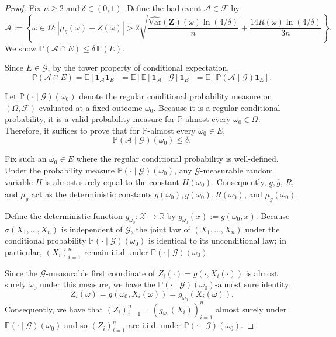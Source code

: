 \documentclass[twoside]{article}
\begin{document}
\begin{proof}
Fix $n\ge 2$ and $\delta\in(0,1)$. Define the bad event $\mathcal A \in \mathcal{F}$ by
\[
\mathcal A
:=
\left\{
\omega \in \Omega :
\left|\mu_g(\omega)-\overline{Z}(\omega)\right|
>
2\sqrt{\frac{\widehat{\mathrm{Var}}(\mathbf Z)(\omega)\ln(4/\delta)}{n}}
+\frac{14R(\omega)\ln(4/\delta)}{3n}
\right\}.
\]
We show $\mathbb{P}(\mathcal A\cap E)\le \delta\,\mathbb{P}(E)$.

Since $E\in\mathcal{G}$, by the tower property of conditional expectation,
\[
\mathbb{P}(\mathcal A\cap E)
=
\mathbb E[\mathbf 1_{\mathcal A}\mathbf 1_E]
=
\mathbb E\left[\mathbb E[\mathbf 1_{\mathcal A}\mid\mathcal{G}]\mathbf 1_E\right]
=
\mathbb E\left[\mathbb{P}(\mathcal A\mid\mathcal{G})\mathbf 1_E\right].
\]

Let $\mathbb{P}(\cdot \mid \mathcal{G})(\omega_0)$ denote the regular conditional probability measure on $(\Omega, \mathcal{F})$ evaluated at a fixed outcome $\omega_0$. Because it is a regular conditional probability, it is a valid probability measure for $\mathbb{P}$-almost every $\omega_0 \in \Omega$. Therefore, it suffices to prove that for $\mathbb{P}$-almost every $\omega_0 \in E$,
\[
\mathbb{P}(\mathcal A\mid\mathcal{G})(\omega_0)\le \delta.
\]

Fix such an $\omega_0\in E$ where the regular conditional probability is well-defined. Under the probability measure $\mathbb{P}(\cdot\mid\mathcal{G})(\omega_0)$, any $\mathcal{G}$-measurable random variable $H$ is almost surely equal to the constant $H(\omega_0)$. Consequently, $\underline{g}, \overline{g}$, $R$, and $\mu_g$ act as the deterministic constants $\underline{g}(\omega_0), \overline{g}(\omega_0), R(\omega_0)$, and $\mu_g(\omega_0)$.

Define the deterministic function $g_{\omega_0}:\mathcal{X}\to\mathbb{R}$ by $g_{\omega_0}(x):=g(\omega_0,x)$. 
Because $\sigma(X_1,\dots,X_n)$ is independent of $\mathcal{G}$, the joint law of $(X_1,\dots,X_n)$ under the conditional probability $\mathbb{P}(\cdot\mid\mathcal{G})(\omega_0)$ is identical to its unconditional law; in particular, $(X_i)_{i=1}^n$ remain i.i.d under $\mathbb{P}(\cdot\mid\mathcal{G})(\omega_0)$.

Since the $\mathcal{G}$-measurable first coordinate of $Z_i(\cdot) = g(\cdot, X_i(\cdot))$ is almost surely $\omega_0$ under this measure, we have the $\mathbb{P}(\cdot\mid\mathcal{G})(\omega_0)$-almost sure identity:
\[
Z_i(\omega) = g(\omega_0, X_i(\omega)) = g_{\omega_0}(X_i(\omega)).
\]
Consequently, we have that $(Z_i)_{i=1}^n = (g_{\omega_0}(X_i))_{i=1}^n$ almost surely under $\mathbb{P}(\cdot\mid\mathcal{G})(\omega_0)$ and so $(Z_i)_{i=1}^n$ are i.i.d. under $\mathbb{P}(\cdot\mid\mathcal{G})(\omega_0)$.
 


\end{proof}
\end{document}
